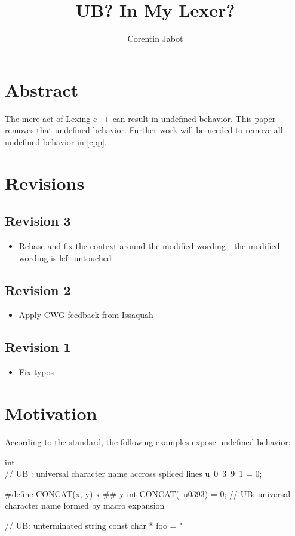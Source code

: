 \documentclass{wg21}
\title{UB? In My Lexer?}
\author{Corentin Jabot}{corentin.jabot@gmail.com}
\begin{document}
\maketitle

\section{Abstract}

The mere act of Lexing c++ can result in undefined behavior.
This paper removes that undefined behavior.
Further work will be needed to remove all undefined behavior in [cpp].


\section{Revisions}

\subsection*{Revision 3}
\begin{itemize}
 \item Rebase and fix the context around the modified wording - the modified wording is left untouched
\end{itemize}

\subsection*{Revision 2}
\begin{itemize}
\item Apply CWG feedback from Issaquah
\end{itemize}

\subsection*{Revision 1}
\begin{itemize}
\item Fix typos
\end{itemize}


\section {Motivation}

According to the standard, the following examples expose undefined behavior:

\begin{colorblock}
int \\ // UB : universal character name accross spliced lines
u\
0\
3\
9\
1 = 0;


#define CONCAT(x, y) x ## y
int CONCAT(\, u0393) = 0; // UB: universal character name formed by macro expansion

// UB: unterminated string
const char * foo = "
\end{colorblock}
\end{document}
